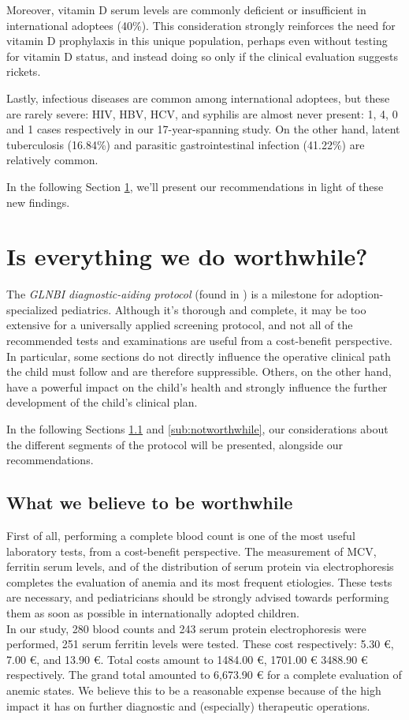 Moreover, vitamin D serum levels are commonly deficient or insufficient in international adoptees (40\%). This consideration strongly reinforces the need for vitamin D prophylaxis  in this unique population, perhaps even without testing for vitamin D status, and instead doing so only if the clinical evaluation suggests rickets.

Lastly, infectious diseases are common among international adoptees, but these are rarely severe: HIV, HBV, HCV, and syphilis are almost never present: 1, 4, 0 and 1 cases respectively in our 17-year-spanning study. On the other hand, latent tuberculosis (16.84\%) and parasitic gastrointestinal infection (41.22\%) are relatively common.

In the following Section \ref{sec:worthwhile?}, we'll present our recommendations in light of these new findings.

\section{Is everything we do worthwhile?}\label{sec:worthwhile?}
The \textit{GLNBI diagnostic-aiding protocol} (found in \cite{GNLBI2}) is a milestone for adoption-specialized pediatrics. Although it's thorough and complete, it may be too extensive for a universally applied screening protocol, and not all of the recommended tests and examinations are useful from a cost-benefit perspective. In particular, some sections do not directly influence the operative clinical path the child must follow and are therefore suppressible. Others, on the other hand, have a powerful impact on the child's health and strongly influence the further development of the child's clinical plan.

In the following Sections \ref{sub:worthwhile} and \ref{sub:notworthwhile}, our considerations about the different segments of the protocol will be presented, alongside our recommendations.

\subsection{What we believe to be worthwhile}\label{sub:worthwhile}
First of all, performing a complete blood count is one of the most useful laboratory tests, from a cost-benefit perspective. The measurement of MCV, ferritin serum levels, and of the distribution of serum protein via electrophoresis completes the evaluation of anemia and its most frequent etiologies. These tests are necessary, and pediatricians should be strongly advised towards performing them as soon as possible in internationally adopted children.\\
In our study, 280 blood counts and 243 serum protein electrophoresis were performed, 251 serum ferritin levels were tested. These cost respectively: 5.30 €, 7.00 €, and 13.90 €. Total costs amount to 1484.00 €, 1701.00 € 3488.90 € respectively. The grand total amounted to 6,673.90 € for a complete evaluation of anemic states. We believe this to be a reasonable expense because of the high impact it has on further diagnostic and (especially) therapeutic operations.

